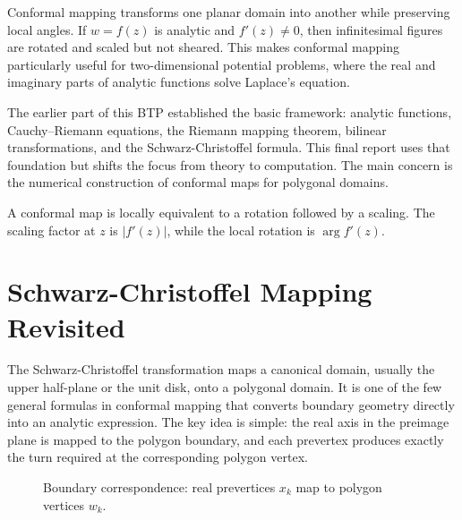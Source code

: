 \documentclass[12pt,a4paper]{article}
\newcommand{\halfplane}{
\begin{scope}
\fill[blue!4] (-2.2,0) rectangle (2.2,1.65);
\draw[->,thick] (-2.35,0) -- (2.45,0) node[right] {$\Re z$};
\draw[->,thick] (0,-0.25) -- (0,1.85) node[above] {$\Im z$};
\foreach \x/\lab in {-1.6/$x_1$,-0.6/$x_2$,0.55/$x_3$,1.65/$x_4$}{
  \filldraw[red!70!black] (\x,0) circle (2pt) node[below=4pt] {\lab};
}
\node at (0,1.35) {upper half-plane};
\end{scope}
}
\begin{document}
Conformal mapping transforms one planar domain into another while preserving local angles. If \(w=f(z)\) is analytic and \(f'(z)\neq0\), then infinitesimal figures are rotated and scaled but not sheared. This makes conformal mapping particularly useful for two-dimensional potential problems, where the real and imaginary parts of analytic functions solve Laplace's equation.

The earlier part of this BTP established the basic framework: analytic functions, Cauchy--Riemann equations, the Riemann mapping theorem, bilinear transformations, and the Schwarz-Christoffel formula. This final report uses that foundation but shifts the focus from theory to computation. The main concern is the numerical construction of conformal maps for polygonal domains.

\begin{definitionbox}
A conformal map is locally equivalent to a rotation followed by a scaling. The scaling factor at \(z\) is \(|f'(z)|\), while the local rotation is \(\arg f'(z)\).
\end{definitionbox}

\section{Schwarz-Christoffel Mapping Revisited}

The Schwarz-Christoffel transformation maps a canonical domain, usually the upper half-plane or the unit disk, onto a polygonal domain. It is one of the few general formulas in conformal mapping that converts boundary geometry directly into an analytic expression. The key idea is simple: the real axis in the preimage plane is mapped to the polygon boundary, and each prevertex produces exactly the turn required at the corresponding polygon vertex.

\begin{figure}[H]
\centering
{}
\caption{Boundary correspondence: real prevertices \(x_k\) map to polygon vertices \(w_k\).}
\end{figure}
\end{document}
